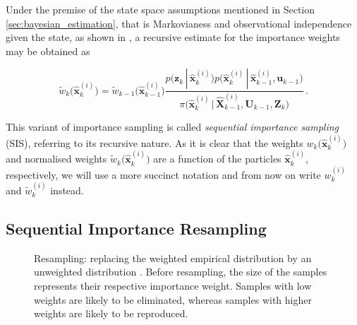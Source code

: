 Under the premise of the state space assumptions mentioned in Section \ref{sec:bayesian_estimation}, that is Markovianess and observational independence given the state, as shown in \cite{doucet2001introduction}, a recursive estimate for the importance weights may be obtained as

\begin{equation}\label{eq:recursive_weights}
  \tilde{w}_k\Big(\hat{\bm{x}}^{(i)}_k\Big) = \tilde{w}_{k-1}\Big(\hat{\bm{x}}^{(i)}_{k-1} \Big) \frac{p\big(\bm{z}_k\,|\,\hat{\bm{x}}^{(i)}_k\big) p\big(\hat{\bm{x}}^{(i)}_k\,|\,\hat{\bm{x}}^{(i)}_{k-1}, \bm{u}_{k-1}\big)}{\pi\big(\hat{\bm{x}}^{(i)}_k\,|\,\hat{\bm{X}}^{(i)}_{k-1}, \bm{U}_{k-1}, \bm{Z}_{k}\big)} \,.
\end{equation}

\noindent
This variant of importance sampling is called \emph{sequential importance sampling} (SIS), referring to its recursive nature. As it is clear that the weights $w_k\big(\hat{\bm{x}}^{(i)}_k\big)$ and normalised weights $\tilde{w}_k\big(\hat{\bm{x}}^{(i)}_k\big)$ are a function of the particles $\hat{\bm{x}}^{(i)}_k$, respectively, we will use a more succinct notation and from now on write $w^{(i)}_k$ and $\tilde{w}^{(i)}_k$ instead.


\subsection{Sequential Importance Resampling}\label{sec:importance_resampling}

\begin{figure}
\centering
{}
\caption[Resampling: replacing the weighted empirical distribution by an unweighted distribution.]{Resampling: replacing the weighted empirical distribution by an unweighted distribution \cite{garciabayes}. Before resampling, the size of the samples represents their respective importance weight. Samples with low weights are likely to be eliminated, whereas samples with higher weights are likely to be reproduced.}
	\label{fig:resampling}
\end{figure}


